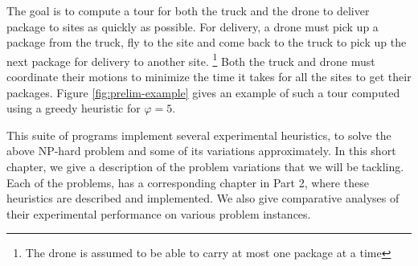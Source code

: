 \documentclass[12pt]{report}
\begin{document}
The goal is to compute a tour for both the truck and the drone to deliver package to sites
as quickly as possible. For delivery, a drone must pick up a package from the
truck, fly to the site and come back to the truck to pick up the next package for
delivery to another site. \footnote{ The drone is assumed to be able to carry at most one package at a time }
Both the truck and drone must coordinate their motions to minimize the time it takes for
all the sites to get their packages. Figure \ref{fig:prelim-example} gives an example of such a tour
computed using a greedy heuristic for $\varphi=5$.


This suite of programs implement several experimental heuristics, to solve the above NP-hard
problem and some of its variations approximately. In this short chapter, we give a description 
of the problem variations that we will be tackling. Each of the problems, has a corresponding chapter 
in Part 2, where these heuristics are described and implemented. We also give comparative analyses of 
their experimental performance on various problem instances. 

\vspace{0.5cm}
\end{document}
